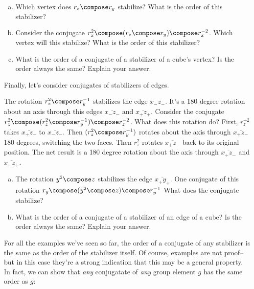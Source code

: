 \begin{exercise}\label{exercise:actions:Conj13}
\begin{enumerate}[(a)]
\item Which vertex does $r_z\compose r_y$ stabilize?  What is the order of this stabilizer?  
\item Consider the conjugate $r_x^{2}\compose (r_z\compose r_y)\compose r_x^{-2}$.  Which vertex will this stabilize?  What is the order of this stabilizer?
\item What is the order of a conjugate of a stabilizer of a  cube's vertex?  Is the order always the same?  Explain your answer.
\end {enumerate}
\end {exercise}

Finally, let's consider  conjugates of stabilizers of edges.

\begin{example}\label{example:actions:Conj14}
The rotation $r_z^2\compose r_y^{-1}$ stabilizes the edge $\overline{x_- z_-}$.  It's a 180 degree rotation about an axis through this edges  $\overline{x_- z_-}$ and $\overline{x_+z_+}$. Consider the conjugate   $r_z^{2}\compose (r_z^2\compose r_y^{-1})\compose r_z^{-2}$.  What does this rotation do?  First,  $r_z^{-2}$ takes $\overline{x_+z_-}$ to $\overline{x_-z_-}$.  Then $(r_z^2\compose r_y^{-1})$ rotates about the axis through $\overline{x_+z_-}$ 180 degrees, switching the two faces. Then $r_z^2$ rotates $\overline{x_+z_-}$ back to its original position.  The net result is a 180 degree rotation about the axis through $\overline{x_+z_-}$ and $\overline{x_-z_+}$.
\end{example}

\begin{exercise}\label{exercise:actions:Conj15}
\begin{enumerate}[(a)]
\item The rotation $y^2\compose z$ stabilizes the edge $\overline{x_+y_+}$. One conjugate of this rotation $r_y\compose (y^2\compose z)\compose r_y^{-1}$ What does the conjugate stabilize?
\item What is the order of a conjugate of a stabilizer of an edge of a cube? Is the  order always the same?  Explain your answer.
\end {enumerate}
\end{exercise}

For all the examples we've seen so far, the order of a conjugate of any stabilizer is the same as the order of the stabilizer itself. Of course, examples are not proof--but in this case they're a strong indication that this may be a general property. In fact, we can show that \emph{any} conjugatate of \emph{any} group element $g$ has the same order as $g$:

